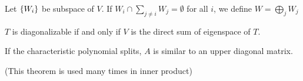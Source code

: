\begin{definition}
    Let $\set{W_i}$ be subspace of $V$. If $W_i \cap \sum_{j \neq i} W_j = \emptyset$ for all $i$, we define  $W = \bigoplus_{j} W_j$
\end{definition}

\begin{theorem}
    $T$ is diagonalizable if and only if $V$ is the direct sum of eigenspace of $T$.    
\end{theorem}



\begin{theorem}\label{split_means_upper_trangular}
    If the characteristic polynomial splits, $A$ is similar to an upper diagonal matrix.
    
    (This theorem is used many times in inner product)
\end{theorem}
